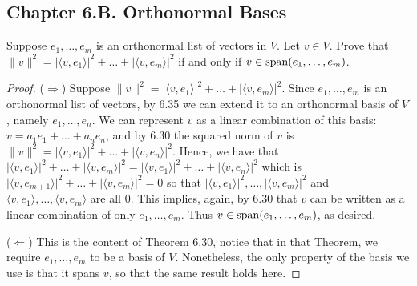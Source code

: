 \subsection*{Chapter 6.B. Orthonormal Bases}


\begin{exercise}{2}
  Suppose $e_1,\dots,e_m$ is an orthonormal list of vectors in $V$. Let $v\in V$. Prove that $\lVert v\rVert^2 =\lvert\langle v,e_1\rangle\rvert^2+\dots+\lvert\langle v,e_m\rangle\rvert^2$ if and only if $v\in\operatorname*{span}(e_1,\dots,e_m)$.
\end{exercise}
\begin{proof}
 ($\Rightarrow$) Suppose $\lVert v\rVert^2 =\lvert\langle v,e_1\rangle\rvert^2+\dots+\lvert\langle v,e_m\rangle\rvert^2$. Since $e_1,\dots,e_m$ is an orthonormal list of vectors, by 6.35 we can extend it to an orthonormal basis of $V$, namely $e_1,\dots,e_n$. We can represent $v$ as a linear combination of this basis: $v=a_1e_1+\dots+a_ne_n$, and by 6.30 the squared norm of $v$ is $\lVert v\rVert^2 =\lvert\langle v,e_1\rangle\rvert^2+\dots+\lvert\langle v,e_n\rangle\rvert^2$. Hence, we have that $\lvert\langle v,e_1\rangle\rvert^2+\dots+\lvert\langle v,e_m\rangle\rvert^2 =\lvert\langle v,e_1\rangle\rvert^2+\dots+\lvert\langle v,e_n\rangle\rvert^2$ which is $\lvert\langle v,e_{m+1}\rangle\rvert^2+\dots+\lvert\langle v,e_m\rangle\rvert^2 =0$ so that $\lvert\langle v,e_1\rangle\rvert^2,\dots,\lvert\langle v,e_m\rangle\rvert^2$ and $\langle v,e_1\rangle,\dots,\langle v,e_m\rangle$ are all 0. This implies, again, by 6.30 that $v$ can be written as a linear combination of only $e_1,\dots,e_m$. Thus $v\in\operatorname*{span}(e_1,\dots,e_m)$, as desired.

 ($\Leftarrow$) This is the content of Theorem 6.30, notice that in that Theorem, we require $e_1,\dots,e_m$ to be a basis of $V$. Nonetheless, the only property of the basis we use is that it spans $v$, so that the same result holds here.
\end{proof}

